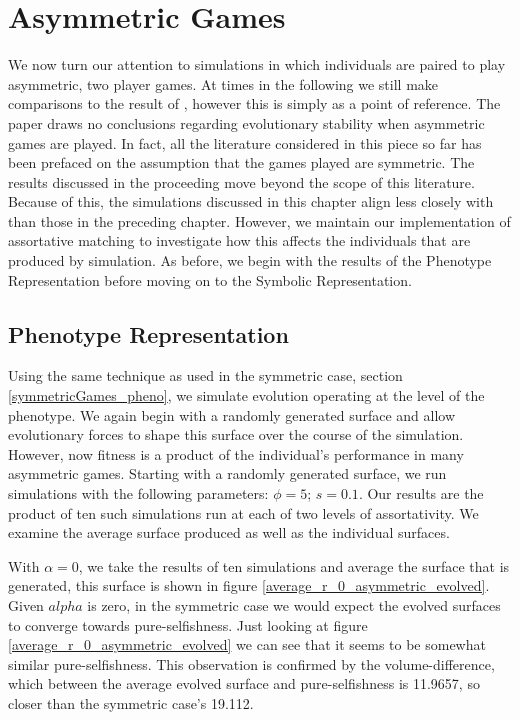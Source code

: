 \documentclass[11pt]{book}
\newcommand*{\np}{\par\noindent\newline}
\begin{document}
\chapter{Asymmetric Games}\label{asymmetricGames}
We now turn our attention to simulations in which individuals are paired to play asymmetric, two player games.
At times in the following we still make comparisons to the result of \citet{alger_generalization_2012}, however this is simply as a point of reference.
The \citeauthor{alger_generalization_2012} paper draws no conclusions regarding evolutionary stability when asymmetric games are played.
In fact, all the literature considered in this piece so far has been prefaced on the assumption that the games played are symmetric.
The results discussed in the proceeding move beyond the scope of this literature. 
Because of this, the simulations discussed in this chapter align less closely with \citet{alger_generalization_2012} than those in the preceding chapter.
However, we maintain our implementation of assortative matching to investigate how this affects the individuals that are produced by simulation.
As before, we begin with the results of the Phenotype Representation before moving on to the Symbolic Representation.


\section{Phenotype Representation}\label{asymmetricGames_pheno}
Using the same technique as used in the symmetric case, section \ref{symmetricGames_pheno}, we simulate evolution operating at the level of the phenotype.
We again begin with a randomly generated surface and allow evolutionary forces to shape this surface over the course of the simulation.
However, now fitness is a product of the individual's performance in many asymmetric games.
Starting with a randomly generated surface, we run simulations with the following parameters: $\phi = 5$; $s = 0.1$.
Our results are the product of ten such simulations run at each of two levels of assortativity.
We examine the average surface produced as well as the individual surfaces.

\np With $\alpha = 0$, we take the results of ten simulations and average the surface that is generated, this surface is shown in figure \ref{average_r_0_asymmetric_evolved}.
Given $alpha$ is zero, in the symmetric case we would expect the evolved surfaces to converge towards pure-selfishness.
Just looking at figure \ref{average_r_0_asymmetric_evolved} we can see that it seems to be somewhat similar pure-selfishness.
This observation is confirmed by the volume-difference, which between the average evolved surface and pure-selfishness is 11.9657, so closer than the symmetric case's 19.112.
\end{document}
